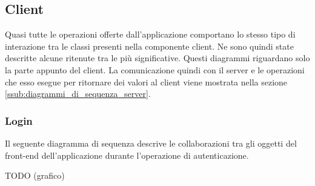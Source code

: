 %


\subsection{Client} %
\label{ssub:diagrammi_di_sequenza_client}
Quasi tutte le operazioni offerte dall'applicazione comportano lo stesso tipo di interazione tra le classi presenti nella componente client. Ne sono quindi state descritte alcune ritenute tra le più significative. \newline
Questi diagrammi riguardano solo la parte appunto del client. La comunicazione quindi con il server e le operazioni che esso esegue per ritornare dei valori al client viene mostrata nella sezione \ref{ssub:diagrammi_di_sequenza_server}.

	\subsubsection{Login} %
	\label{ssub:login}
	Il seguente diagramma di sequenza descrive le collaborazioni tra gli oggetti del front-end dell'applicazione durante l'operazione di autenticazione. \newline

	TODO (grafico) \newline
	\noindent

